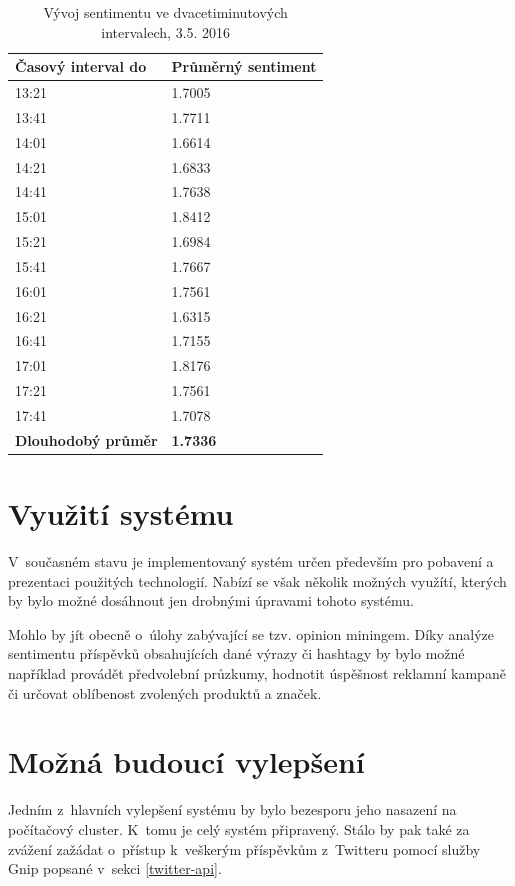 \documentclass[thesis=B,czech]{FITthesis}[2012/06/26]
\begin{document}
\begin{table}[h]
\centering
\begin{tabular}{|l|l|}
\hline
\textbf{Časový interval do}            & \textbf{Průměrný sentiment} \\ \hline
13:21 & 1.7005 \\ \hline
13:41 & 1.7711  \\ \hline
14:01 & 1.6614 \\ \hline
14:21 & 1.6833 \\ \hline
14:41 & 1.7638  \\ \hline
15:01 & 1.8412  \\ \hline
15:21 & 1.6984 \\ \hline
15:41 & 1.7667 \\ \hline
16:01 & 1.7561 \\ \hline
16:21 & 1.6315 \\ \hline
16:41 & 1.7155 \\ \hline
17:01 & 1.8176 \\ \hline
17:21 & 1.7561 \\ \hline
17:41 & 1.7078 \\ \hline
\textbf{Dlouhodobý průměr}& \textbf{1.7336}    \\ \hline
\end{tabular}
\caption{Vývoj sentimentu ve dvacetiminutových intervalech, 3.5. 2016}
\label{sentiment-table}
\end{table}

\section{Využití systému}
V~současném stavu je implementovaný systém určen především pro pobavení a prezentaci použitých technologií. Nabízí se však několik možných využítí, kterých by bylo možné dosáhnout jen drobnými úpravami tohoto systému. 

Mohlo by jít obecně o~úlohy zabývající se tzv. opinion miningem. Díky analýze sentimentu příspěvků obsahujících dané výrazy či hashtagy by bylo možné například provádět předvolební průzkumy, hodnotit úspěšnost reklamní kampaně či určovat oblíbenost zvolených produktů a značek. 


\section{Možná budoucí vylepšení}
Jedním z~hlavních vylepšení systému by bylo bezesporu jeho nasazení na počítačový cluster. K~tomu je celý systém připravený. Stálo by pak také za zvážení zažádat o~přístup k~veškerým příspěvkům z~Twitteru pomocí služby Gnip popsané v~sekci \ref{twitter-api}. 
\end{document}
